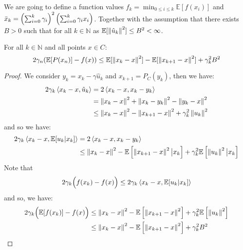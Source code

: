 \begin{remark}
    We are going to define a function values $f_k = \min_{0\le i\le k}\mathbb{E}[f(x_i)]$ and $\bar{x}_k = \left( \sum^k_{i=0}\gamma_i \right)^2\left( \sum^k_{i=0}\gamma_ix_i \right)$. Together with the assumption that there exists $B>0$ such that for all $k\in\mathbb{N}$ as $\mathbb{E}[\left\lVert\hat{u}_k\right\rVert^2]\le B^2<\infty$. 
\end{remark}

\begin{lemma}
    For all $k\in\mathbb{N}$ and all points $x\in C$:
    \begin{equation*}
        2\gamma_n(\mathbb{E}[P(x_n)] - f(x)) \le \mathbb{E}[\left\lVert x_k-x\right\rVert^2] - \mathbb{E}[\left\lVert x_{k+1} - x\right\rVert^2] + \gamma_k^2 B^2
    \end{equation*}
\end{lemma}
\begin{proof}
    We consider $y_k = x_k - \gamma\hat{u}_k$ and $x_{k+1}=P_C(y_k)$, then we have:
    \begin{equation*}
    \begin{aligned}
        2\gamma_k\left\langle x_k - x, \hat{u}_k \right\rangle &= 2\left\langle x_k - x, x_k - y_k \right\rangle \\ 
        &= \left\lVert x_k-x\right\rVert^2 + \left\lVert x_k-y_k\right\rVert^2 - \left\lVert y_k-x\right\rVert^2 \\
        &\le \left\lVert x_k-x\right\rVert^2 - \left\lVert x_{k+1}-x\right\rVert^2 + \gamma_k^2\left\lVert u_k\right\rVert^2 \\
    \end{aligned}
    \end{equation*}
    and so we have:
    \begin{equation*}
    \begin{aligned}
        2\gamma_k\left\langle x_k - x, \mathbb{E}[u_k| x_k] \right\rangle &= 2\left\langle x_k - x, x_k - y_k \right\rangle \\ 
        &\le \left\lVert x_k-x\right\rVert^2 - \mathbb{E}\left[ \left\lVert x_{k+1}-x\right\rVert^2\big|x_k \right] + \gamma_k^2\mathbb{E}\left[ \left\lVert u_k\right\rVert^2\big|x_k \right] \\
    \end{aligned}
    \end{equation*}
    Note that 
    \begin{equation*}
        2\gamma_k\Big( f(x_k) - f(x) \Big) \le 2\gamma_k\left\langle x_k - x, \mathbb{E}[u_k| x_k] \right\rangle
    \end{equation*}
    and so, we have:
    \begin{equation*}
    \begin{aligned}
        2\gamma_k\Big( \mathbb{E}[f(x_k)] - f(x) \Big) &\le \left\lVert x_k-x\right\rVert^2 - \mathbb{E}\left[ \left\lVert x_{k+1}-x\right\rVert^2 \right] + \gamma_k^2\mathbb{E}\left[ \left\lVert u_k\right\rVert^2 \right] \\
        &\le \left\lVert x_k-x\right\rVert^2 - \mathbb{E}\left[ \left\lVert x_{k+1}-x\right\rVert^2 \right] + \gamma_k^2B^2 \\ 
    \end{aligned}
    \end{equation*}
\end{proof}

